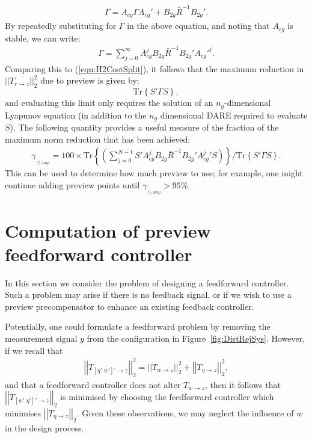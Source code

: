 \documentclass[a4paper,12pt]{article}
\theoremstyle{remark}
\newcommand{\nrm}[1]{\left|\left| #1 \right|\right|}
\newcommand{\als}[1]{\begin{align*} #1 \end{align*}}
\newcommand{\aln}[1]{\begin{align} #1 \end{align}}
\newcommand{\tra}[1]{\textrm{Tr}\left\{ #1 \right\}}
\begin{document}
\als{
\Gamma=A_{cg}\Gamma A_{cg}'+B_{2g}\bar R^{-1}B_{2g}'
.}
By repeatedly substituting for $\Gamma$ in the above equation, and noting that $A_{cg}$ is stable, we can write:
\als{
\Gamma=\sum_{j=0}^{\infty}A_{cg}^jB_{2g}\bar R ^{-1}B_{2g}'{A_{cg}'}^{j}
.}
Comparing this to (\ref{eqn:H2CostSplit}), it follows that the maximum reduction in $\nrm{T_{r\rightarrow z}}_2^2$ due to preview is given by: 
\[
\tra{S'\Gamma S},
\]
and evaluating this limit only requires the solution of an $n_g$-dimensional Lyapunov equation (in addition to the $n_g$ dimensional DARE required to evaluate $S$). The following quantity provides a useful measure of the fraction of the maximum norm reduction that has been achieved:
\aln{\gamma_{\,_{\%,imp}}=100\times \tra {\left(\sum_{j=0}^{N-1}S' A^j_{cg} B_{2g}{\bar R}^{-1} B_{2g}'{A^j_{cg}}'S\right)} / \tra{S'\Gamma S}.\label{eqn:gamimp}} 
This can be used to determine how much preview to use; for example, one might continue adding preview points until $\gamma_{\,_{\%,imp}} >95 \%$.

 
\section{Computation of preview feedforward controller} 
\label{sec:Preproc}
In this section we consider the problem of designing a feedforward controller. Such a problem may arise if there is no feedback signal, or if we wish to use a preview precompensator to enhance an existing feedback controller. 


Potentially, one could formulate a feedforward problem by removing the measurement signal $y$ from the configuration in Figure~\ref{fig:DistRejSys}. However, if we recall that 
\als{
\nrm{T_{{[\eta'\,\,w']'}\rightarrow z}}^2_2 =
\nrm{T_{w\rightarrow z}}^2_2+
\nrm{T_{\eta\rightarrow z}}^2_2,}
and that a feedforward controller does not alter $T_{w\rightarrow z}$, then it follows that $\nrm{T_{[w'\,\, \eta']'\rightarrow z}}_2$ is minimised by choosing the feedforward controller which minimises $\nrm{T_{\eta \rightarrow z}}_2$.  Given these observations, we may neglect the influence of $w$ in the design process.
\end{document}
